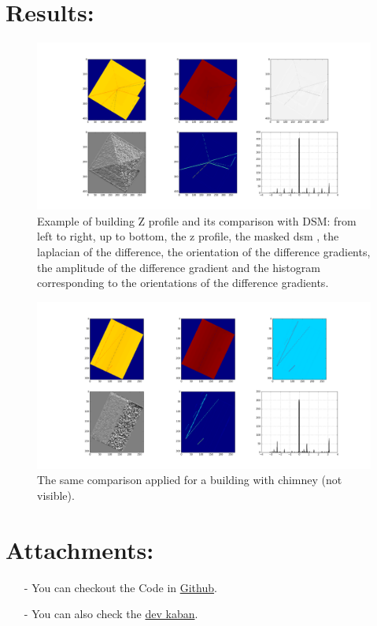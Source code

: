 \documentclass[a4paper, 11pt]{article}
\begin{document}
	\section*{Results:}
	\begin{figure}[H]
		\begin{center}
			\caption{\label{img::comparison} Example of building Z profile and its comparison with DSM: from left to right, up to bottom, the z profile, the  masked dsm , the laplacian of the difference, the orientation of the difference gradients, the amplitude of the difference gradient and the histogram corresponding to the orientations of the difference gradients.}
			\includegraphics[scale=.25]{images/raster/elancourt/prototyping_1246-13704_T25177_T25178_T25179_T25180.png}
		\end{center}
	\end{figure}
	
	\begin{figure}[H]
		\begin{center}
			\caption{\label{img::comparison_bis} The same comparison applied for a building with chimney (not visible).}
			\includegraphics[scale=.25]{images/raster/elancourt/prototyping_1246-13704_T23621_T23622.png}
		\end{center}
	\end{figure}
	
\section*{Attachments:}

\begin{itemize}
	\item[-] You can checkout the Code in \href{https://github.com/Ethiy/3DSceneModel}{Github}.
	\item[-] You can also check the \href{https://github.com/Ethiy/3DSceneModel/projects/1}{dev kaban}.
\end{itemize}
	
\end{document}
